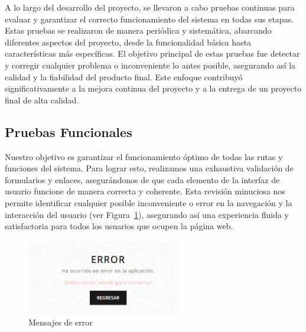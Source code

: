 \documentclass[a4paper, 12pt]{book}
\begin{document}
A lo largo del desarrollo del proyecto, se llevaron a cabo pruebas continuas para evaluar y garantizar el correcto funcionamiento del 
sistema en todas sus etapas. Estas pruebas se realizaron de manera periódica y sistemática, abarcando diferentes aspectos del proyecto, 
desde la funcionalidad básica hasta características más específicas. El objetivo principal de estas pruebas fue detectar y corregir 
cualquier problema o inconveniente lo antes posible, asegurando así la calidad y la fiabilidad del producto final. Este enfoque 
contribuyó significativamente a la mejora continua del proyecto y a la entrega de un proyecto final de alta calidad.
\subsection{Pruebas Funcionales}
\label{sec:funcionalidad}
Nuestro objetivo es garantizar el funcionamiento óptimo de todas las rutas y funciones del sistema. Para lograr esto, realizamos 
una exhaustiva validación de formularios y enlaces, asegurándonos de que cada elemento de la interfaz de usuario funcione de manera 
correcta y coherente. Esta revisión minuciosa nos permite identificar cualquier posible inconveniente o error en la navegación y la 
interacción del usuario (ver Figura~\ref{fig:errorse}), asegurando así una experiencia fluida y satisfactoria para todos los usuarios que ocupen la página web.

\begin{figure}
  \centering
  \includegraphics[width=0.6\textwidth]{img/error.png}
  \caption{Mensajes de error}
  \label{fig:errorse}
\end{figure}
\end{document}
